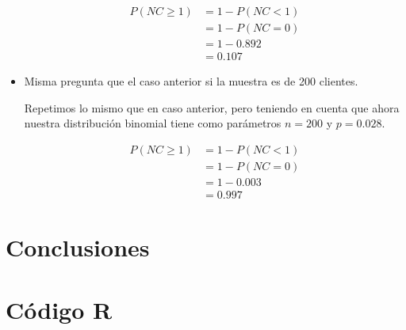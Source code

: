 \documentclass[12pt,a4paper,twoside,openright,titlepage,final]{article}
\begin{document}
\begin{itemize}
\begin{align*}
P(NC \geq 1) &= 1 - P(NC < 1) \\ &= 1 - P(NC = 0) \\ &= 1 - 0.892 \\ &= 0.107
\end{align*}  

\item Misma pregunta que el caso anterior si la muestra es de 200 clientes.

Repetimos lo mismo que en caso anterior, pero teniendo en cuenta que ahora nuestra distribución binomial tiene como parámetros $n = 200$ y $p = 0.028$.

\begin{align*}
P(NC \geq 1) &= 1 - P(NC < 1) \\ &= 1 - P(NC = 0) \\ &= 1 - 0.003 \\ &= 0.997
\end{align*}

\end{itemize}

\section{Conclusiones}

\newpage

\section{Código R}


\end{document}
